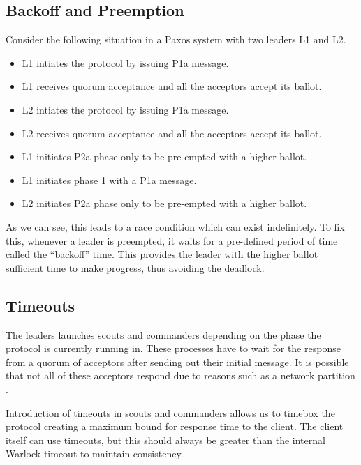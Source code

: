 \subsection{Backoff and Preemption}

Consider the following situation in a Paxos system with two leaders L1 and L2.

\begin{itemize}
  \item L1 intiates the protocol by issuing P1a message.
  \item L1 receives quorum acceptance and all the acceptors accept its ballot.
  \item L2 intiates the protocol by issuing P1a message.
  \item L2 receives quorum acceptance and all the acceptors accept its ballot.
  \item L1 initiates P2a phase only to be pre-empted with a higher ballot.
  \item L1 initiates phase 1 with a P1a message.
  \item L2 initiates P2a phase only to be pre-empted with a higher ballot.
\end{itemize}

As we can see, this leads to a race condition which can exist indefinitely. To
fix this, whenever a leader is preempted, it waits for a pre-defined period of
time called the ``backoff'' time. This provides the leader with the higher
ballot sufficient time to make progress, thus avoiding the deadlock.

\subsection{Timeouts}

The leaders launches scouts and commanders depending on the phase the protocol
is currently running in. These processes have to wait for the response from
a quorum of acceptors after sending out their initial message. It is possible
that not all of these acceptors respond due to reasons such as a network
partition%
.

Introduction of timeouts in scouts and commanders allows us to timebox the
protocol creating a maximum bound for response time to the client. The client
itself can use timeouts, but this should always be greater than the internal
Warlock timeout to maintain consistency.

